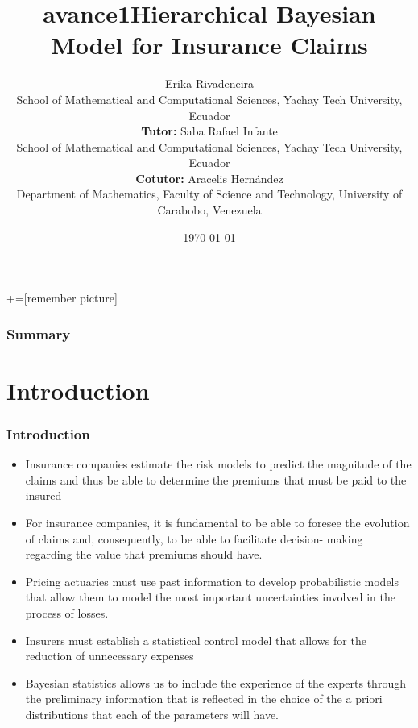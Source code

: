 \documentclass[10pt]{beamer} %
\title{avance1}
\title{Hierarchical Bayesian Model for Insurance Claims}
\author[]{Erika Rivadeneira\\ School of Mathematical and Computational Sciences, Yachay Tech University, Ecuador
\vspace{0.25cm}
\\{\small{\textbf{Tutor:} Saba Rafael Infante\\School of Mathematical and Computational Sciences, Yachay Tech University, Ecuador\\\textbf{Cotutor:} Aracelis Hernández\\Department of Mathematics, Faculty of Science and Technology, University of Carabobo, Venezuela}}}
\date{\today}
\begin{document}
+=[remember picture]
\lstset{}   
\everymath{\displaystyle}

\begin{frame}
	\titlepage
\end{frame}

\begin{frame}
\frametitle{Summary}
\tableofcontents
\end{frame}

\section{Introduction}

\begin{frame}
\frametitle[9pt]{Introduction}
\begin{itemize}
    \item Insurance companies estimate the risk models to predict the magnitude of the claims and thus be able to determine the premiums that must be paid to the insured
    \item For insurance companies, it is fundamental to be able to foresee the evolution of claims and, consequently, to be able to facilitate decision- making regarding the value that premiums should have.
    \item Pricing actuaries must use past information to develop probabilistic models that allow them to model the most important uncertainties involved in the process of losses. 
    \item Insurers must establish a statistical control model that allows for the reduction of unnecessary expenses
    \item Bayesian statistics allows us to include the experience of the experts through the preliminary information that is reflected in the choice of the a priori distributions that each of the parameters will have.
    
\end{itemize}

\end{frame}
\end{document}
